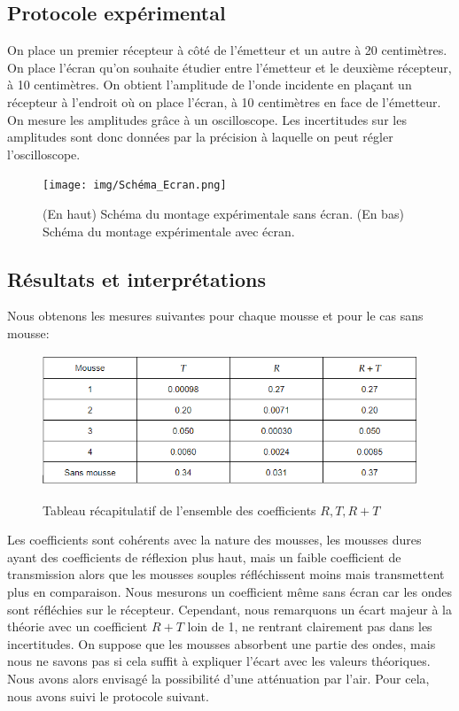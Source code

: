 \documentclass[12pt]{article}
\begin{document}
\subsection{Protocole expérimental}
On place un premier récepteur à côté de l'émetteur et un autre à 20 centimètres. On place l'écran qu'on souhaite étudier entre l'émetteur et le deuxième récepteur, à 10 centimètres. On obtient l'amplitude de l'onde incidente en plaçant un récepteur à l'endroit où on place l'écran, à 10 centimètres en face de l'émetteur. On mesure les amplitudes grâce à un oscilloscope. Les incertitudes sur les amplitudes sont donc données par la précision à laquelle on peut régler l'oscilloscope. 

\begin{figure}[h!]
	\begin{center}
		\texttt{[image: img/Schéma\_Ecran.png]}
		\label{Schéma Ecran}
		\caption{(En haut) Schéma du montage expérimentale sans écran. (En bas) Schéma du montage expérimentale avec écran.}
	\end{center}
\end{figure} 

\break
\subsection{Résultats et interprétations}

Nous obtenons les mesures suivantes pour chaque mousse et pour le cas sans mousse:
\begin{figure}[h!]
	\begin{center}
		\includegraphics[scale=0.7]{img/tableau.png}
		\label{Stableau}
		\caption{Tableau récapitulatif de l'ensemble des coefficients $R, T, R+T$}
	\end{center}
\end{figure} 

Les coefficients sont cohérents avec la nature des mousses, les mousses dures ayant des coefficients de réflexion plus haut, mais un faible coefficient de transmission
alors que les mousses souples réfléchissent moins mais transmettent plus en comparaison. Nous mesurons un coefficient même sans écran car les ondes sont réfléchies sur le récepteur. 
 Cependant, nous remarquons un écart majeur à la théorie avec un coefficient $R+T$ loin de 1, ne rentrant 
clairement pas dans les incertitudes.
On suppose que les mousses absorbent une partie des ondes, mais nous ne savons pas si cela suffit à expliquer l'écart avec les valeurs théoriques.
Nous avons alors envisagé la possibilité d'une atténuation par l'air. Pour cela, nous avons suivi le protocole suivant. 
\end{document}
